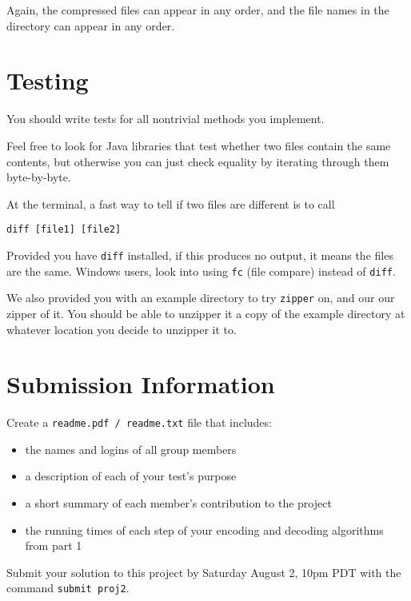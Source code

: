 \documentclass[11pt]{article}
\begin{document}
Again, the compressed files can appear in any order, and the file names in the directory can appear in any order.

\newpage

\section*{Testing}

You should write tests for all nontrivial methods you implement. 

Feel free to look for Java libraries that test whether two files contain the same contents, but otherwise you can just check equality by iterating through them byte-by-byte.

At the terminal, a fast way to tell if two files are different is to call 

\texttt{diff [file1] [file2]}

Provided you have \texttt{diff} installed, if this produces no output, it means the files are the same. Windows users, look into using \texttt{fc} (file compare) instead of \texttt{diff}.

We also provided you with an example directory to try \texttt{zipper} on, and our our zipper of it. You should be able to unzipper it a copy of the example directory at whatever location you decide to unzipper it to.

\section*{Submission Information}

Create a \texttt{readme.pdf / readme.txt} file that includes:
\begin{itemize}
\item the names and logins of all group members
\item a description of each of your test's purpose
\item a short summary of each member's contribution to the project
\item the running times of each step of your encoding and decoding algorithms from part 1
\end{itemize}

Submit your solution to this project by Saturday August 2, 10pm PDT with the command \texttt{submit proj2}.
\end{document}
